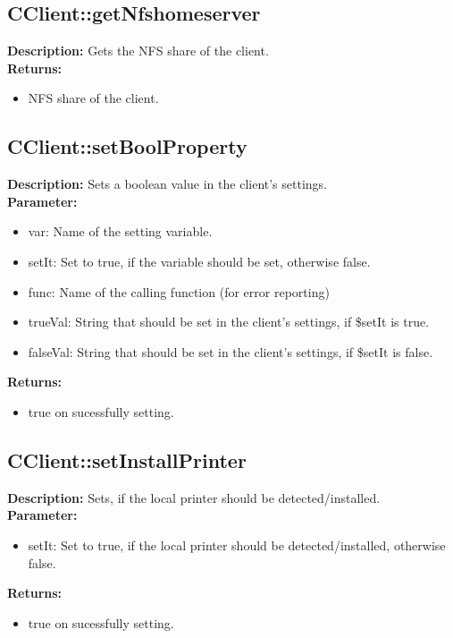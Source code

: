\subsection{CClient::getNfshomeserver}
\textbf{Description:} Gets the NFS share of the client.\\
\textbf{Returns:}
\begin{itemize}
\item NFS share of the client.
\end{itemize}

\subsection{CClient::setBoolProperty}
\textbf{Description:} Sets a boolean value in the client's settings.\\
\textbf{Parameter:}
\begin{itemize}
\item var: Name of the setting variable.
\item setIt: Set to true, if the variable should be set, otherwise false.
\item func: Name of the calling function (for error reporting)
\item trueVal: String that should be set in the client's settings, if \$setIt is true.
\item falseVal: String that should be set in the client's settings, if \$setIt is false.
\end{itemize}
\textbf{Returns:}
\begin{itemize}
\item true on sucessfully setting.
\end{itemize}

\subsection{CClient::setInstallPrinter}
\textbf{Description:} Sets, if the local printer should be detected/installed.\\
\textbf{Parameter:}
\begin{itemize}
\item setIt: Set to true, if the local printer should be detected/installed, otherwise false.
\end{itemize}
\textbf{Returns:}
\begin{itemize}
\item true on sucessfully setting.
\end{itemize}

